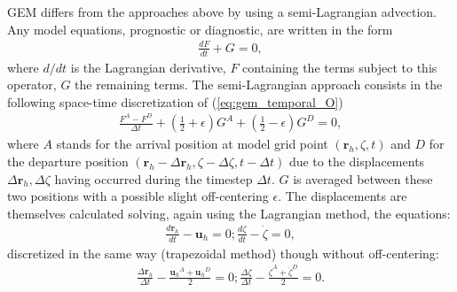 \documentclass[gmd, manuscript]{copernicus}
\newcommand{\vb}{\mathbf}
\begin{document}
GEM differs from the approaches above by using a semi-Lagrangian advection.
Any model equations, prognostic or diagnostic, are written in the form
\begin{align}
\frac {dF}{dt}+G=0,
\label{eq:gem_temporal_O}
\end{align}
\noindent where $d/dt$ is the Lagrangian derivative, $F$ containing the terms subject to this operator, $G$ the remaining terms.
The semi-Lagrangian approach consists in the following space-time discretization of (\ref{eq:gem_temporal_O})
\begin{align}
\frac{F^A-F^{D}} {\Delta t}+ \left( \frac{1}{2} + \epsilon \right)G^A + \left( \frac{1}{2} - \epsilon\right )G^D = 0,
\label{eq:gem_temporal_D}
\end{align}
where $A$ stands for the arrival position at model grid point $(\vb{r}_h, \zeta, t)$
and $D$ for the departure position $(\vb{r}_h-\Delta\vb{r}_h, \zeta-\Delta \zeta, t-\Delta t)$
due to the displacements $\Delta\vb{r}_h, \Delta \zeta$
having occurred during the timestep $\Delta t$.
$G$ is averaged between these two positions with a possible slight off-centering $\epsilon$.
The displacements are themselves calculated solving, again using the Lagrangian method, the equations:
\begin{align}
\frac {d\vb{r}_h}{dt} - \vb{u}_h = 0 ; \frac {d\zeta}{dt} - \dot{\zeta} = 0,
\label{eq:gem_temporal_d_O}
\end{align}
discretized in the same way (trapezoidal method) though without off-centering:
\begin{align}
\frac{\Delta \vb{r}_h}{\Delta t} - \frac{ {\vb{u}_h}^A + {\vb{u}_h}^D }{2} = 0;
\frac{\Delta \zeta}{\Delta t} - \frac{\dot{\zeta}^A + \dot{\zeta}^D}{2} = 0.
\label{eq:gem_temporal_d_D}
\end{align}
\end{document}
